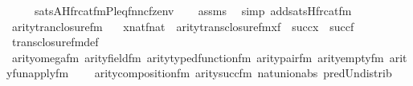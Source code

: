 \begin{isabellebody}
\ \ \ \ {\isasymlongleftrightarrow}\ sats{\isacharparenleft}{\kern0pt}A{\isacharcomma}{\kern0pt}Hfrc{\isacharunderscore}{\kern0pt}at{\isacharunderscore}{\kern0pt}fm{\isacharparenleft}{\kern0pt}P{\isacharcomma}{\kern0pt}leq{\isacharcomma}{\kern0pt}fnnc{\isacharcomma}{\kern0pt}f{\isacharcomma}{\kern0pt}z{\isacharparenright}{\kern0pt}{\isacharcomma}{\kern0pt}env{\isacharparenright}{\kern0pt}{\isachardoublequoteclose}\isanewline
%
\isadelimproof
\ \ %
\endisadelimproof
%
\isatagproof
{}\isamarkupfalse%
\ assms\ \isamarkupfalse%
\ {\isacharparenleft}{\kern0pt}simp\ add{\isacharcolon}{\kern0pt}sats{\isacharunderscore}{\kern0pt}Hfrc{\isacharunderscore}{\kern0pt}at{\isacharunderscore}{\kern0pt}fm{\isacharparenright}{\kern0pt}%
\endisatagproof
{\isafoldproof}%
%
\isadelimproof
\isanewline
%
\endisadelimproof
\isanewline
{}\isamarkupfalse%
\ arity{\isacharunderscore}{\kern0pt}tran{\isacharunderscore}{\kern0pt}closure{\isacharunderscore}{\kern0pt}fm\ {\isacharcolon}{\kern0pt}\isanewline
\ \ {\isachardoublequoteopen}{\isasymlbrakk}x{\isasymin}nat{\isacharsemicolon}{\kern0pt}f{\isasymin}nat{\isasymrbrakk}\ {\isasymLongrightarrow}\ arity{\isacharparenleft}{\kern0pt}trans{\isacharunderscore}{\kern0pt}closure{\isacharunderscore}{\kern0pt}fm{\isacharparenleft}{\kern0pt}x{\isacharcomma}{\kern0pt}f{\isacharparenright}{\kern0pt}{\isacharparenright}{\kern0pt}\ {\isacharequal}{\kern0pt}\ succ{\isacharparenleft}{\kern0pt}x{\isacharparenright}{\kern0pt}\ {\isasymunion}\ succ{\isacharparenleft}{\kern0pt}f{\isacharparenright}{\kern0pt}{\isachardoublequoteclose}\isanewline
%
\isadelimproof
\ \ %
\endisadelimproof
%
\isatagproof
{}\isamarkupfalse%
\ trans{\isacharunderscore}{\kern0pt}closure{\isacharunderscore}{\kern0pt}fm{\isacharunderscore}{\kern0pt}def\isanewline
\ \ \isamarkupfalse%
\ arity{\isacharunderscore}{\kern0pt}omega{\isacharunderscore}{\kern0pt}fm\ arity{\isacharunderscore}{\kern0pt}field{\isacharunderscore}{\kern0pt}fm\ arity{\isacharunderscore}{\kern0pt}typed{\isacharunderscore}{\kern0pt}function{\isacharunderscore}{\kern0pt}fm\ arity{\isacharunderscore}{\kern0pt}pair{\isacharunderscore}{\kern0pt}fm\ arity{\isacharunderscore}{\kern0pt}empty{\isacharunderscore}{\kern0pt}fm\ arity{\isacharunderscore}{\kern0pt}fun{\isacharunderscore}{\kern0pt}apply{\isacharunderscore}{\kern0pt}fm\isanewline
\ \ \ \ arity{\isacharunderscore}{\kern0pt}composition{\isacharunderscore}{\kern0pt}fm\ arity{\isacharunderscore}{\kern0pt}succ{\isacharunderscore}{\kern0pt}fm\ nat{\isacharunderscore}{\kern0pt}union{\isacharunderscore}{\kern0pt}abs{}\ pred{\isacharunderscore}{\kern0pt}Un{\isacharunderscore}{\kern0pt}distrib\ \isanewline

\end{isabellebody}
